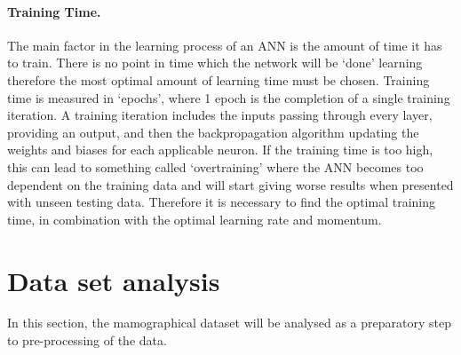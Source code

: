 \documentclass[12pt]{article}
\begin{document}
        \paragraph{Training Time.}
          The main factor in the learning process of an ANN is the amount of time it has to train. There is no point in time which the network will be ‘done’ learning therefore the most optimal amount of learning time must be chosen. Training time is measured in ‘epochs’, where 1 epoch is the completion of a single training iteration. A training iteration includes the inputs passing through every layer, providing an output, and then the backpropagation algorithm updating the weights and biases for each applicable neuron. If the training time is too high, this can lead to something called ‘overtraining’ where the ANN becomes too dependent on the training data and will start giving worse results when presented with unseen testing data. Therefore it is necessary to find the optimal training time, in combination with the optimal learning rate and momentum.

\section{Data set analysis} \label{data-set-analysis}
  In this section, the mamographical dataset will be analysed as a preparatory step to pre-processing of the data.

\end{document}
